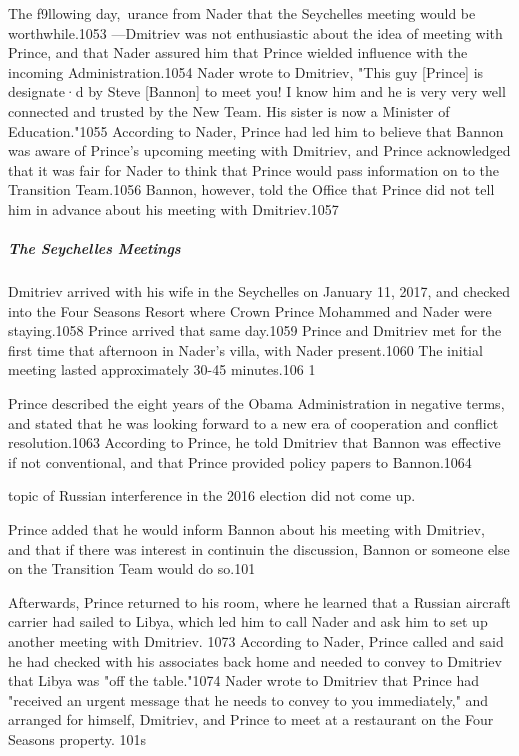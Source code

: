 The f9llowing day,~urance from Nader that the Seychelles meeting would be worthwhile.1053 ---Dmitriev was not enthusiastic about the idea of meeting with Prince, and that Nader assured him that Prince wielded influence with the incoming Administration.1054 Nader wrote to Dmitriev,  "This guy [Prince] is designate·d by Steve [Bannon] to meet you! I  know him and he is very very well connected and trusted by the New Team. His sister is now a Minister of Education."1055 According to Nader, Prince had led him to believe that Bannon was aware of Prince's upcoming meeting with Dmitriev, and Prince acknowledged that it was fair for Nader to think that Prince would pass information on to the Transition Team.1056 Bannon, however, told the Office that Prince did not tell him in advance about his meeting with Dmitriev.1057

\subparagraph{The Seychelles Meetings}

Dmitriev arrived with his wife in the Seychelles on January 11, 2017, and checked into the Four Seasons Resort where Crown Prince Mohammed and Nader were staying.1058 Prince arrived that same day.1059 Prince and Dmitriev met for the first time that afternoon in Nader's villa, with Nader present.1060 The initial meeting lasted approximately 30-45 minutes.106 1

Prince described the eight years of the Obama Administration in negative terms, and stated that he was looking forward to a new era of cooperation and conflict resolution.1063 According to Prince, he told Dmitriev that Bannon was effective if not conventional, and that Prince provided policy papers to Bannon.1064

topic of Russian interference in the 2016 election did not come up.

Prince added that he would inform Bannon about his meeting with Dmitriev, and that if there was interest in continuin the discussion, Bannon or someone else on the Transition Team would do so.101

Afterwards, Prince returned to his room,  where he learned that a  Russian aircraft carrier had sailed to Libya, which led him to call Nader and ask him to set up another meeting with Dmitriev. 1073 According to Nader, Prince called and said he had checked with his associates back home and needed to convey to Dmitriev that Libya was "off the table."1074 Nader wrote to Dmitriev that Prince had "received an urgent message that he needs to convey to you immediately," and arranged for himself, Dmitriev, and Prince to meet at a  restaurant on the Four Seasons property. 101s

